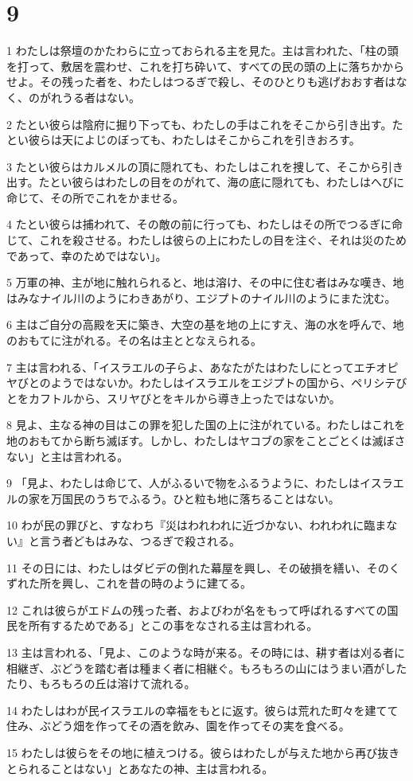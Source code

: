 \chapter{9}

\par 1 わたしは祭壇のかたわらに立っておられる主を見た。主は言われた、「柱の頭を打って、敷居を震わせ、これを打ち砕いて、すべての民の頭の上に落ちかからせよ。その残った者を、わたしはつるぎで殺し、そのひとりも逃げおおす者はなく、のがれうる者はない。
\par 2 たとい彼らは陰府に掘り下っても、わたしの手はこれをそこから引き出す。たとい彼らは天によじのぼっても、わたしはそこからこれを引きおろす。
\par 3 たとい彼らはカルメルの頂に隠れても、わたしはこれを捜して、そこから引き出す。たとい彼らはわたしの目をのがれて、海の底に隠れても、わたしはへびに命じて、その所でこれをかませる。
\par 4 たとい彼らは捕われて、その敵の前に行っても、わたしはその所でつるぎに命じて、これを殺させる。わたしは彼らの上にわたしの目を注ぐ、それは災のためであって、幸のためではない」。
\par 5 万軍の神、主が地に触れられると、地は溶け、その中に住む者はみな嘆き、地はみなナイル川のようにわきあがり、エジプトのナイル川のようにまた沈む。
\par 6 主はご自分の高殿を天に築き、大空の基を地の上にすえ、海の水を呼んで、地のおもてに注がれる。その名は主ととなえられる。
\par 7 主は言われる、「イスラエルの子らよ、あなたがたはわたしにとってエチオピヤびとのようではないか。わたしはイスラエルをエジプトの国から、ペリシテびとをカフトルから、スリヤびとをキルから導き上ったではないか。
\par 8 見よ、主なる神の目はこの罪を犯した国の上に注がれている。わたしはこれを地のおもてから断ち滅ぼす。しかし、わたしはヤコブの家をことごとくは滅ぼさない」と主は言われる。
\par 9 「見よ、わたしは命じて、人がふるいで物をふるうように、わたしはイスラエルの家を万国民のうちでふるう。ひと粒も地に落ちることはない。
\par 10 わが民の罪びと、すなわち『災はわれわれに近づかない、われわれに臨まない』と言う者どもはみな、つるぎで殺される。
\par 11 その日には、わたしはダビデの倒れた幕屋を興し、その破損を繕い、そのくずれた所を興し、これを昔の時のように建てる。
\par 12 これは彼らがエドムの残った者、およびわが名をもって呼ばれるすべての国民を所有するためである」とこの事をなされる主は言われる。
\par 13 主は言われる、「見よ、このような時が来る。その時には、耕す者は刈る者に相継ぎ、ぶどうを踏む者は種まく者に相継ぐ。もろもろの山にはうまい酒がしたたり、もろもろの丘は溶けて流れる。
\par 14 わたしはわが民イスラエルの幸福をもとに返す。彼らは荒れた町々を建てて住み、ぶどう畑を作ってその酒を飲み、園を作ってその実を食べる。
\par 15 わたしは彼らをその地に植えつける。彼らはわたしが与えた地から再び抜きとられることはない」とあなたの神、主は言われる。


